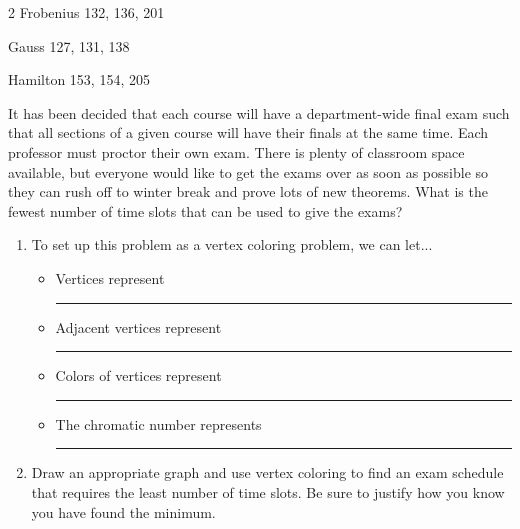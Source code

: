 \documentclass[12pt]{article}
\begin{document}
\begin{enumerate}
\begin{multicols}{2}
Frobenius 132, 136, 201

Gauss 127, 131, 138

Hamilton 153, 154, 205
\end{multicols}

It has been decided that each course will have a department-wide final exam such that all sections of a given course will have their finals at the same time. Each professor must proctor their own exam. There is plenty of classroom space available, but everyone would like to get the exams over as soon as possible so they can rush off to winter break and prove lots of new theorems. What is the fewest number of time slots that can be used to give the exams?

\begin{enumerate}
\item To set up this problem as a vertex coloring problem, we can let...

\begin{itemize}
\item Vertices represent \rule{1cm}{0.15mm}
\item Adjacent vertices represent \rule{1cm}{0.15mm}
\item Colors of vertices represent \rule{1cm}{0.15mm}
\item The chromatic number represents \rule{1cm}{0.15mm}
\end{itemize}
\item Draw an appropriate graph and use vertex coloring to find an exam schedule that requires the least number of time slots. Be sure to justify how you know you have found the minimum. 
\end{enumerate}
    
  
\end{enumerate}
\end{document}
